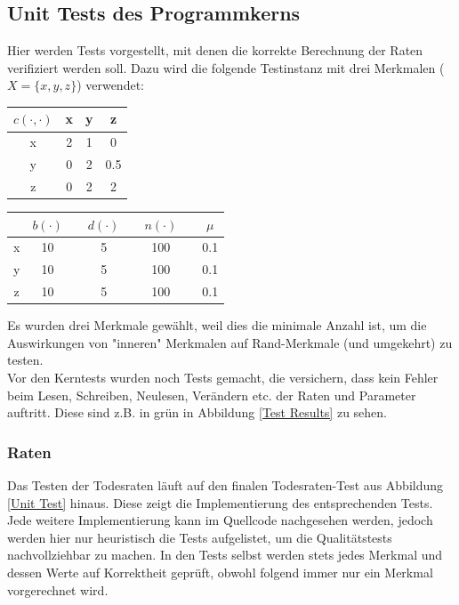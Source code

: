 \documentclass[11pt, a4paper, german]{article}
\theoremstyle{plain}
\begin{document}
	\subsection{Unit Tests des Programmkerns}
	Hier werden Tests vorgestellt, mit denen die korrekte Berechnung der Raten verifiziert werden soll. Dazu wird die folgende Testinstanz mit drei Merkmalen ($ X = \{x,y,z\} $) verwendet:\\
	\begin{center}
		\begin{minipage}{0.35 \textwidth}
			\begin{tabular}{ c | c c c }
			 $ c(\cdot, \cdot) $ & x & y & z \\
			 \hline
			 x & 2 & 1 & 0 \\
			 y & 0 & 2 & 0.5 \\
			 z & 0 & 2 & 2 \\
			\end{tabular}
			\end{minipage}
			\begin{minipage}{0.5 \textwidth}
			\begin{tabular}{ c | c  c  c  c  c  c  c }
			 & $ b(\cdot ) $ &  & $ d(\cdot ) $ & & $ n(\cdot ) $ & & $ \mu $\\
			 \hline
			 x & 10 &  & 5 & & 100 & & 0.1\\
			 y & 10 &  & 5 & & 100 & & 0.1\\   
			 z & 10 &  & 5 & & 100 & & 0.1\\
			\end{tabular}
			\end{minipage}
	\end{center}
	Es wurden drei Merkmale gewählt, weil dies die minimale Anzahl ist, um die Auswirkungen von "{}inneren"{} Merkmalen auf Rand-Merkmale (und umgekehrt) zu testen.\\
	Vor den Kerntests wurden noch Tests gemacht, die versichern, dass kein Fehler beim Lesen, Schreiben, Neulesen, Verändern etc. der Raten und Parameter auftritt. Diese sind z.B. in grün in Abbildung \ref{Test Results} zu sehen.

	\subsubsection{Raten}
	Das Testen der Todesraten läuft auf den finalen Todesraten-Test aus Abbildung \ref{Unit Test} hinaus. Diese zeigt die Implementierung des entsprechenden Tests. Jede weitere Implementierung kann im Quellcode nachgesehen werden, jedoch werden hier nur heuristisch die Tests aufgelistet, um die Qualitätstests nachvollziehbar zu machen. In den Tests selbst werden stets jedes Merkmal und dessen Werte auf Korrektheit geprüft, obwohl folgend immer nur ein Merkmal vorgerechnet wird.\\
	
\end{document}

